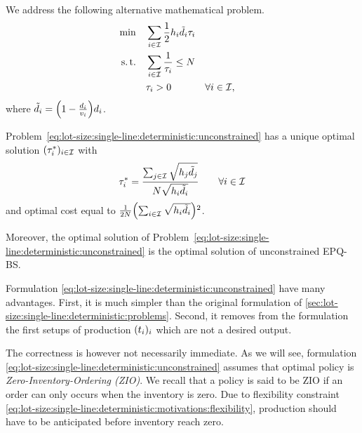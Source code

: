 We address the following alternative mathematical problem.
\begin{subequations}\label{eq:lot-size:single-line:deterministic:unconstrained}
  \begin{align}
  \min\quad & \displaystyle\sum_{i\in\mathcal{I}} \frac{1}{2}h_i\tilde{d}_i\tau_i
  \label{eq:lot-size:single-line:deterministic:unconstrained:objective}
  \\
  \operatorname{s.t.}\quad  & \displaystyle\sum_{i\in\mathcal{I}} \frac{1}{\tau_i} \le N
  \label{eq:lot-size:single-line:deterministic:unconstrained:flexibility}
  \\
       & \tau_i > 0 && \forall i\in\mathcal{I},
  \label{eq:lot-size:single-line:deterministic:unconstrained:positivity}
  \end{align}
\end{subequations}
where $\tilde{\demand}_i=\bracket{1-\frac{\demand_i}{\rate_i}}\demand_i$.

\begin{thm}\label{thm:lot-size:single-line:deterministic:unconstrained:optimality}
Problem~\eqref{eq:lot-size:single-line:deterministic:unconstrained} has a unique optimal solution $(\tau_i^*)_{i\in\mathcal{I}}$ with
\begin{equation}
  \tau_i^*= \frac{\sum_{j\in\mathcal{I}}\sqrt{h_j\tilde{d}_j}}{N\sqrt{h_i\tilde{d}_i}}\qquad\forall i\in\mathcal{I}
\end{equation}
and optimal cost equal to $\frac{1}{2\nbsetups}\bracket{\sum_{i\in\REF}\sqrt{\holding_i\tilde{\demand_i}}}^2$.

Moreover, the optimal solution of Problem~\eqref{eq:lot-size:single-line:deterministic:unconstrained} is the optimal solution of unconstrained EPQ-BS.
\end{thm}


Formulation \eqref{eq:lot-size:single-line:deterministic:unconstrained} have many advantages.
First, it is much simpler than the original formulation of \cref{sec:lot-size:single-line:deterministic:problems}.
Second, it removes from the formulation the first setups of production $\bracket{t_i}_i$ which are not a desired output.


The correctness is however not necessarily immediate.
As we will see, formulation \eqref{eq:lot-size:single-line:deterministic:unconstrained} assumes that optimal policy is \emph{Zero-Inventory-Ordering (ZIO)}.
We recall that a policy is said to be ZIO if an order can only occurs when the inventory is zero.
Due to flexibility constraint \eqref{eq:lot-size:single-line:deterministic:motivations:flexibility}, production should have to be anticipated before inventory reach zero.


